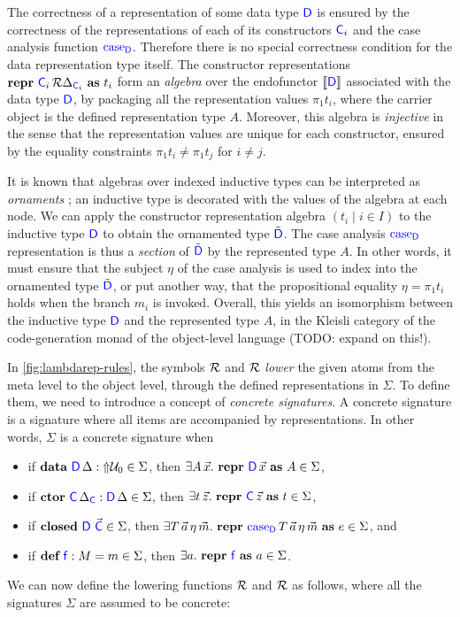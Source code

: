 The correctness of a representation of some data type $\lab{D}$ is ensured by
the correctness of the representations of each of its constructors $\lab{C}_i$
and the case analysis function $\caselab{D}$. Therefore there is no special
correctness condition for the data representation type itself. The constructor
representations $\Sreprvar{R}{\lab{C}_i}{\Crepr{\Delta_{\lab{C}_i}}}{t_i}$ form
an \emph{algebra} over the endofunctor $\llbracket \lab{D} \rrbracket$
associated with the data type $\lab{D}$, by packaging all the representation
values $\pi_1 t_i$, where the carrier object is the defined representation type
$A$. Moreover, this algebra is \emph{injective} in the sense that the
representation values are unique for each constructor, ensured by the equality
constraints $\pi_1 t_i \neq \pi_1 t_j$ for $i \neq j$.

It is known that algebras over indexed inductive types can be interpreted as
\emph{ornaments} \cite{Dagand2017-nj}; an inductive type is decorated with the
values of the algebra at each node. We can apply the constructor representation
algebra $(t_i \mid i \in I)$ to the inductive type $\lab{D}$ to obtain the
ornamented type $\tilde{\lab{D}}$. The case analysis $\caselab{D}$
representation is thus a \emph{section} of $\tilde{\lab{D}}$ by the represented
type $A$. In other words, it must ensure that the subject $\eta$ of the case
analysis is used to index into the ornamented type $\tilde{\lab{D}}$, or put
another way, that the propositional equality $\eta = \pi_1 t_i$ holds when the
branch $m_i$ is invoked. Overall, this yields an isomorphism between the
inductive type $\lab{D}$ and the represented type $A$, in the Kleisli category
of the code-generation monad of the object-level language (TODO: expand on
this!).

In \cref{fig:lambdarep-rules}, the symbols $\Crepr{}$ and $\crepr{}$
\emph{lower} the given atoms from the meta level to the object level, through
the defined representations in $\Sigma$. To define them, we need to introduce a
concept of \emph{concrete signatures}. A concrete signature is a signature
where all items are accompanied by representations. In other words, $\Sigma$ is
a concrete signature when
\begin{itemize}
  \item if $\Sdata{D}{\Delta} \in \Sigma$, then $\exists A \, \vec{x} .\
          \Srepr{R}{D}{\vec{x}}{A} \in \Sigma$,
  \item if $\Sctorvar{\lab{C}}{\Delta_{\lab{C}}}{D}{\Delta} \in \Sigma$, then $\exists
          t\,\vec{z} .\ \Sreprvar{R}{\lab{C}}{\vec{z}}{t} \in \Sigma$,
  \item if $\Sclosed{\lab{D}}{\vec{\lab{C}}} \in \Sigma$, then $\exists
          T\,\vec{a}\,\eta\,\vec{m} .\ \Srepr{R}{\caselab{D}}{T\,\vec{a}\,\eta\,\vec{m}
          }{e} \in \Sigma$, and
  \item if $\Sdef{f}{M}{m} \in \Sigma$, then $\exists a .\ \Sreprconst{R}{f}{a} \in
          \Sigma$.
\end{itemize}
We can now define the lowering functions $\Crepr{}$ and $\crepr{}$ as follows, where
all the signatures $\Sigma$ are assumed to be concrete:

